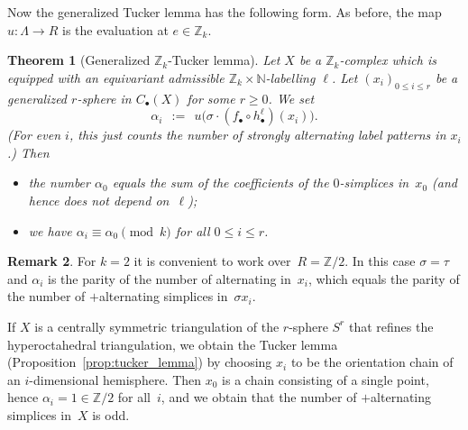 \documentclass[11pt,a4paper,draft]{article}
\newcommand{\Z}{{\mathbb Z}}
\newcommand{\N}{{\mathbb N}}
\newtheorem{theorem}{Theorem}[section]
\theoremstyle{definition}
\newtheorem{remark}[theorem]{Remark}
\begin{document}
Now the generalized Tucker lemma has the following form. As before,
the map $u : \Lambda \to R$ is the evaluation at $e \in \Z_k$.

\begin{theorem}[Generalized $\Z_k$-Tucker lemma]\label{thm:count-transfer}
Let $X$ be a $\Z_k$-complex which is equipped with an
equivariant admissible $\Z_k\times\N$-labelling $\ell$. Let $(x_i)_{0\le i\le r}$ be
a generalized $r$-sphere in $C_\bullet(X)$ for some $r\ge0$.
We set
\[
  \alpha_i \ \ :=\ \ u \big(\sigma \cdot (   f_\bullet \circ  h_\bullet^{\ell})  (x_i) \big).
\]
(For even $i$, this just counts the number of strongly alternating label 
patterns in $x_i$.)
Then \begin{itemize}
    \item the number $\alpha_0$ equals the sum of the coefficients of the
          $0$-simplices in~$x_0$ (and hence does not depend on~$\ell$);
    \item we have $\alpha_i\equiv \alpha_0\pmod k$ for all $0\le i\le r$.
\end{itemize}
\end{theorem}

\begin{remark}
For $k=2$ it is convenient to work over~$R=\Z/2$.  In this case
$\sigma=\tau$ and $\alpha_i$ is the parity of the number of
alternating  in~$x_i$, which equals the parity of the number
of $+$alternating simplices in~$\sigma x_i$.

If $X$ is a centrally symmetric triangulation of the $r$-sphere $S^r$
that refines the hyperoctahedral triangulation, we obtain the Tucker
lemma (Proposition~\ref{prop:tucker_lemma}) by choosing $x_i$ to be the
orientation chain of an $i$-dimensional hemisphere.  Then $x_0$ is a
chain consisting
of a single point, hence $\alpha_i=1\in\Z/2$ for all~$i$, and we
obtain that the number of $+$alternating simplices in~$X$ is odd.
\end{remark}
\end{document}
